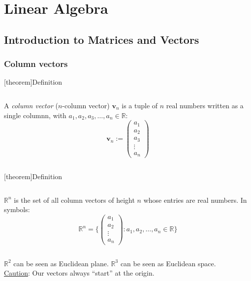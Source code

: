 \documentclass[12pt]{report}
\theoremstyle{definition}
\begin{document}
\chapter{Linear Algebra}

\section{Introduction to Matrices and Vectors}

\subsection{Column vectors}

[theorem]{Definition}
\begin{column vector}
    A \emph{column vector} ($n$-column vector) $\pmb{v}_n$ is a tuple of $n$ real numbers written as a single columnn, 
    with $a_1, a_2, a_3, \ldots, a_n \in \mathbb{R}$:\[
    \pmb{v}_n := 
    \begin{pmatrix}
        a_1 \\
        a_2 \\
        a_3 \\
        \vdots \\
        a_n
    \end{pmatrix}
    \]
\end{column vector}

[theorem]{Definition}
\begin{set of column vectors}
    $\mathbb{R}^{n}$ is the set of all column vectors of height $n$ whose entries are real numbers.
    In symbols:\[
        \mathbb{R}^{n} = \{
            \begin{pmatrix}
                    a_1\\
                    a_2\\
                    \vdots\\
                    a_n
            \end{pmatrix}
            : a_1, a_2, \ldots, a_n \in \mathbb{R}
        \} 
    \]
\end{set of column vectors}

\begin{ex}
    $\mathbb{R}^{2}$ can be seen as Euclidean plane. $\mathbb{R}^{3}$ can be seen as Euclidean space.
    \\\underline{Caution}: Our vectors always ``start'' at the origin.
\end{ex}
\end{document}
